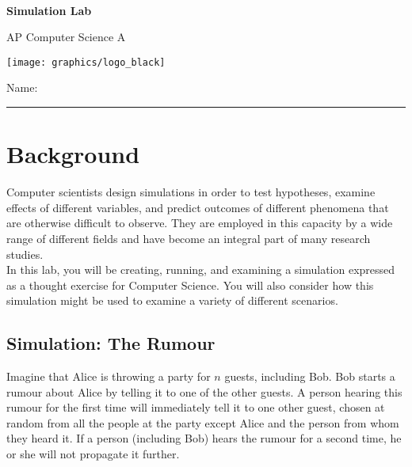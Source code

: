

\def\LabCourse{AP Computer Science A}
\def\LabNumber{02}
\def\LabTitle{Simulation Lab}


	\begin{coverpages}
		\ \\[2cm]
		\begin{center}
			\huge
			\textbf{\LabTitle}

			\Large
			\LabCourse
		\end{center}

		\vspace{1.5cm}

		\begin{center}
			\texttt{[image: graphics/logo\_black]}

			\vspace{2.5cm}

			\Large
			Name: \rule{11.5cm}{0.1pt}
		\end{center}
	\end{coverpages}

	\thispagestyle{empty}
	\tableofcontents

	\pagebreak

	\section{Background}
		Computer scientists design simulations in order to test hypotheses, examine effects of different variables, and predict outcomes of different phenomena that are otherwise difficult to observe. They are employed in this capacity by a wide range of different fields and have become an integral part of many research studies.\\[\baselineskip]
	  In this lab, you will be creating, running, and examining a simulation expressed as a thought exercise for Computer Science. You will also consider how this simulation might be used to examine a variety of different scenarios.

	  \subsection{Simulation: The Rumour}
		  Imagine that Alice is throwing a party for $n$ guests, including Bob. Bob starts a rumour about Alice by telling it to one of the other guests. A person hearing this rumour for the first time will immediately tell it to one other guest, chosen at random from all the people at the party except Alice and the person from whom they heard it. If a person (including Bob) hears the rumour for a second time, he or she will not propagate it further.


